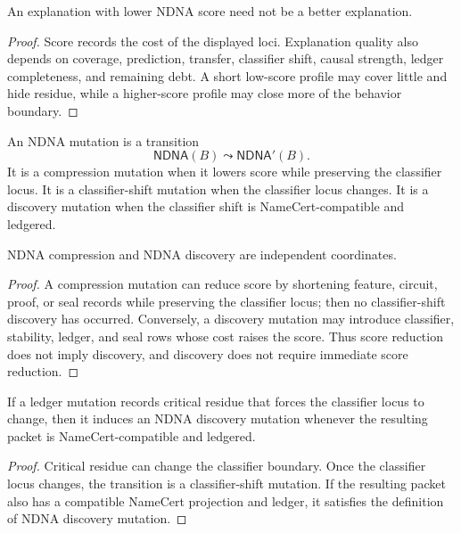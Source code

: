 \begin{theorem}
\label{thm:philosophy-lower-ndna-score-not-better-explanation}
An explanation with lower NDNA score need not be a better explanation.
\end{theorem}
\begin{proof}
Score records the cost of the displayed loci. Explanation quality also
depends on coverage, prediction, transfer, classifier shift, causal
strength, ledger completeness, and remaining debt. A short low-score
profile may cover little and hide residue, while a higher-score profile
may close more of the behavior boundary.
\end{proof}

\begin{definition}
\label{def:philosophy-ndna-mutations}
An NDNA mutation is a transition
$$
\mathsf{NDNA}(B)\leadsto\mathsf{NDNA}'(B).
$$
It is a compression mutation when it lowers score while preserving the
classifier locus. It is a classifier-shift mutation when the classifier
locus changes. It is a discovery mutation when the classifier shift is
NameCert-compatible and ledgered.
\end{definition}

\begin{theorem}
\label{thm:philosophy-ndna-compression-discovery-independent}
NDNA compression and NDNA discovery are independent coordinates.
\end{theorem}
\begin{proof}
A compression mutation can reduce score by shortening feature,
circuit, proof, or seal records while preserving the classifier locus;
then no classifier-shift discovery has occurred. Conversely, a discovery
mutation may introduce classifier, stability, ledger, and seal rows whose
cost raises the score. Thus score reduction does not imply discovery,
and discovery does not require immediate score reduction.
\end{proof}

\begin{theorem}
\label{thm:philosophy-ledger-mutation-can-induce-ndna-discovery}
If a ledger mutation records critical residue that forces the classifier
locus to change, then it induces an NDNA discovery mutation whenever the
resulting packet is NameCert-compatible and ledgered.
\end{theorem}
\begin{proof}
Critical residue can change the classifier boundary. Once the classifier
locus changes, the transition is a classifier-shift mutation. If the
resulting packet also has a compatible NameCert projection and ledger,
it satisfies the definition of NDNA discovery mutation.
\end{proof}


